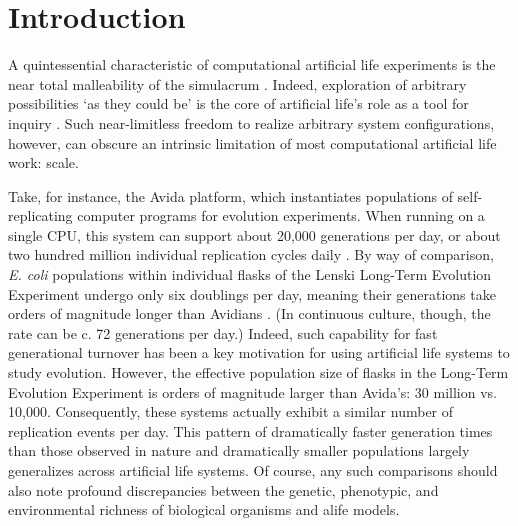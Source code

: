 \section{Introduction}

A quintessential characteristic of computational artificial life experiments is the near total malleability of the simulacrum \citep{pattee1989simulations}.
Indeed, exploration of arbitrary possibilities `as they could be' is the core of artificial life's role as a tool for inquiry \citep{langton1997artificial}.
Such near-limitless freedom to realize arbitrary system configurations, however, can obscure an intrinsic limitation of most computational artificial life work: scale.

Take, for instance, the Avida platform, which instantiates populations of self-replicating computer programs for evolution experiments.
When running on a single CPU, this system can support about 20,000 generations per day, or about two hundred million individual replication cycles daily \citep{ofria2009artificial}.
By way of comparison, \textit{E. coli} populations within individual flasks of the Lenski Long-Term Evolution Experiment undergo only six doublings per day, meaning their generations take orders of magnitude longer than Avidians \citep{good2017dynamics}.
(In continuous culture, though, the rate can be c. 72 generations per day.)
Indeed, such capability for fast generational turnover has been a key motivation for using artificial life systems to study evolution.
However, the effective population size of flasks in the Long-Term Evolution Experiment is orders of magnitude larger than Avida's: 30 million vs. 10,000.
Consequently, these systems actually exhibit a similar number of replication events per day.
This pattern of dramatically faster generation times than those observed in nature and dramatically smaller populations largely generalizes across artificial life systems.
Of course, any such comparisons should also note profound discrepancies between the genetic, phenotypic, and environmental richness of biological organisms and alife models.

